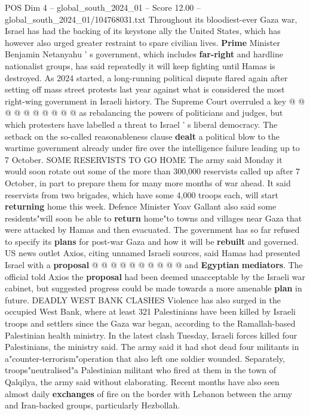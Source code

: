 \begin{textsample}{POS Dim 4 – global\_south\_2024\_01 – Score 12.00 – global\_south\_2024\_01/104768031.txt}
Throughout its bloodiest-ever Gaza war, Israel has had the backing of its keystone ally the United States, which has however also urged greater restraint to spare civilian lives. \textbf{Prime} Minister Benjamin Netanyahu ' s government, which includes \textbf{far-right} and hardline nationalist groups, has said repeatedly it will keep fighting until Hamas is destroyed.
As 2024 started, a long-running political dispute flared again after setting off mass street protests last year against what is considered the most right-wing government in Israeli history.
The Supreme Court overruled a key @ @ @ @ @ @ @ @ @ @ as rebalancing the powers of politicians and judges, but which protesters have labelled a threat to Israel ' s liberal democracy.
The setback on the so-called reasonableness clause \textbf{dealt} a political blow to the wartime government already under fire over the intelligence failure leading up to 7 October.
SOME RESERVISTS TO GO HOME The army said Monday it would soon rotate out some of the more than 300,000 reservists called up after 7 October, in part to prepare them for many more months of war ahead.
It said reservists from two brigades, which have some 4,000 troops each, will start \textbf{returning} home this week.
Defence Minister Yoav Gallant also said some residents"will soon be able to \textbf{return} home"to towns and villages near Gaza that were attacked by Hamas and then evacuated.
The government has so far refused to specify its \textbf{plans} for post-war Gaza and how it will be \textbf{rebuilt} and governed.
US news outlet Axios, citing unnamed Israeli sources, said Hamas had presented Israel with a \textbf{proposal} @ @ @ @ @ @ @ @ @ @ and \textbf{Egyptian} \textbf{mediators}.
The official told Axios the \textbf{proposal} had been deemed unacceptable by the Israeli war cabinet, but suggested progress could be made towards a more amenable \textbf{plan} in future.
DEADLY WEST BANK CLASHES Violence has also surged in the occupied West Bank, where at least 321 Palestinians have been killed by Israeli troops and settlers since the Gaza war began, according to the Ramallah-based Palestinian health ministry.
In the latest clash Tuesday, Israeli forces killed four Palestinians, the ministry said.
The army said it had shot dead four militants in a"counter-terrorism"operation that also left one soldier wounded.
Separately, troops"neutralised"a Palestinian militant who fired at them in the town of Qalqilya, the army said without elaborating.
Recent months have also seen almost daily \textbf{exchanges} of fire on the border with Lebanon between the army and Iran-backed groups, particularly Hezbollah.

\end{textsample}
